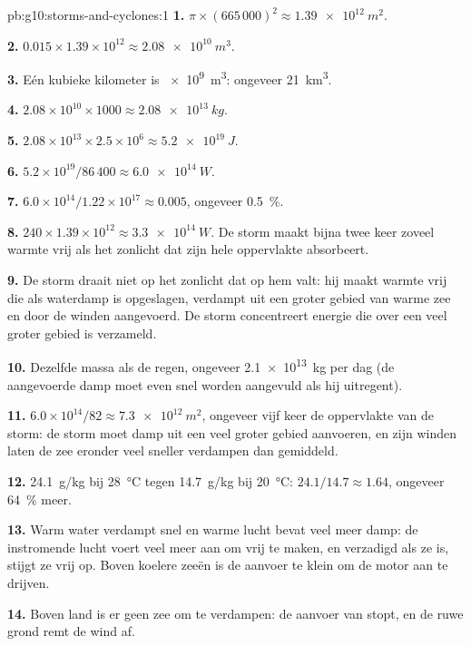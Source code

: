 \begin{solution}{pb:g10:storms-and-cyclones:1}
\textbf{1.} $\pi \times (665\,000)^2 \approx \qty{1.39e12}{m^2}$.

\textbf{2.} $0.015 \times 1.39\times10^{12} \approx \qty{2.08e10}{m^3}$.

\textbf{3.} Eén kubieke kilometer is \qty{e9}{m^3}: ongeveer \qty{21}{km^3}.

\textbf{4.} $2.08\times10^{10} \times 1000 \approx \qty{2.08e13}{kg}$.

\textbf{5.} $2.08\times10^{13} \times 2.5\times10^6 \approx \qty{5.2e19}{J}$.

\textbf{6.} $5.2\times10^{19}/86\,400 \approx \qty{6.0e14}{W}$.

\textbf{7.} $6.0\times10^{14}/1.22\times10^{17} \approx 0.005$, ongeveer
\qty{0.5}{\percent}.

\textbf{8.} $240 \times 1.39\times10^{12} \approx \qty{3.3e14}{W}$. De storm
maakt bijna twee keer zoveel warmte vrij als het zonlicht dat zijn hele
oppervlakte absorbeert.

\textbf{9.} De storm draait niet op het zonlicht dat op hem valt: hij maakt
warmte vrij die als waterdamp is opgeslagen, verdampt uit een groter gebied van
warme zee en door de winden aangevoerd. De storm concentreert energie die over
een veel groter gebied is verzameld.

\textbf{10.} Dezelfde massa als de regen, ongeveer \qty{2.1e13}{kg} per dag (de
aangevoerde damp moet even snel worden aangevuld als hij uitregent).

\textbf{11.} $6.0\times10^{14}/82 \approx \qty{7.3e12}{m^2}$, ongeveer vijf keer
de oppervlakte van de storm: de storm moet damp uit een veel groter gebied
aanvoeren, en zijn winden laten de zee eronder veel sneller verdampen dan
gemiddeld.

\textbf{12.} \qty{24.1}{g/kg} bij \qty{28}{\degreeCelsius} tegen
\qty{14.7}{g/kg} bij \qty{20}{\degreeCelsius}: $24.1/14.7 \approx 1.64$,
ongeveer \qty{64}{\percent} meer.

\textbf{13.} Warm water verdampt snel en warme lucht bevat veel meer damp: de
instromende lucht voert veel meer  aan om vrij te maken, en
verzadigd als ze is, stijgt ze vrij op. Boven koelere zeeën is de aanvoer te
klein om de motor aan te drijven.

\textbf{14.} Boven land is er geen zee om te verdampen: de aanvoer van  stopt, en de ruwe grond remt de wind af.


\end{solution}
